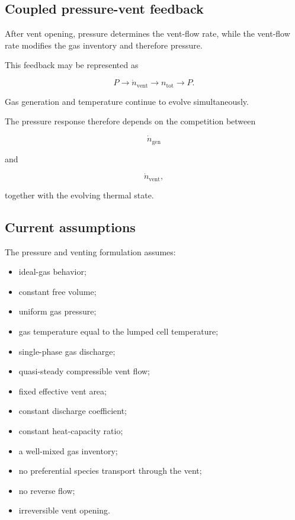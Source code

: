 \subsection{Coupled pressure-vent feedback}

After vent opening, pressure determines the vent-flow rate, while the
vent-flow rate modifies the gas inventory and therefore pressure.

This feedback may be represented as

\begin{equation}
    P
    \longrightarrow
    \dot{n}_{\mathrm{vent}}
    \longrightarrow
    n_{\mathrm{tot}}
    \longrightarrow
    P.
\end{equation}

Gas generation and temperature continue to evolve simultaneously.

The pressure response therefore depends on the competition between

\begin{equation}
    \dot{n}_{\mathrm{gen}}
\end{equation}

and

\begin{equation}
    \dot{n}_{\mathrm{vent}},
\end{equation}

together with the evolving thermal state.


\subsection{Current assumptions}

The pressure and venting formulation assumes:

\begin{itemize}
    \item ideal-gas behavior;
    \item constant free volume;
    \item uniform gas pressure;
    \item gas temperature equal to the lumped cell temperature;
    \item single-phase gas discharge;
    \item quasi-steady compressible vent flow;
    \item fixed effective vent area;
    \item constant discharge coefficient;
    \item constant heat-capacity ratio;
    \item a well-mixed gas inventory;
    \item no preferential species transport through the vent;
    \item no reverse flow;
    \item irreversible vent opening.
\end{itemize}


